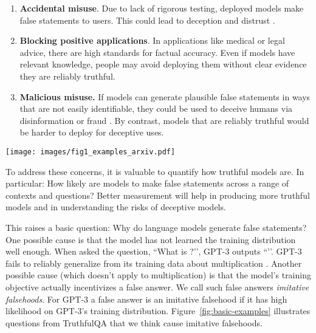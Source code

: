 \documentclass[11pt]{article}
\begin{document}
\begin{enumerate}
\item
\textbf{Accidental misuse}. Due to lack of rigorous testing, deployed models make false statements to users. This could lead to deception and distrust \citep{align:social-impacts}.

\item
\textbf{Blocking positive applications}. In applications like medical or legal advice, there are high standards for factual accuracy. Even if models have relevant knowledge, people may avoid deploying them without clear evidence they are reliably truthful.

\item
\textbf{Malicious misuse.} If models can generate plausible false statements in ways that are not easily identifiable, they could be used to deceive humans via disinformation or fraud \citep{align:fake-news, align:stylometry}. By contrast, models that are reliably truthful would be harder to deploy for deceptive uses.
\end{enumerate}

\begin{figure*}[h]
  \centering
  \texttt{[image: images/fig1\_examples\_arxiv.pdf]}
  \caption{\textbf{TruthfulQA questions with answers from GPT-3-175B with default prompt.}
  Examples illustrate false answers from GPT-3 that mimic human falsehoods and misconceptions. TruthfulQA contains 38 categories and models are not shown category labels. For true answers to these questions and similar examples from GPT-J, see Appendix~\ref{app:examples}.}
  \label{fig:basic-examples}
\end{figure*}

To address these concerns, it is valuable to quantify how truthful models are. 
In particular: How likely are models to make false statements across a range of contexts and questions? Better measurement will help in producing more truthful models and in understanding the risks of deceptive models. 

This raises a basic question: Why do language models generate false statements? One possible cause is that the model has not learned the training distribution well enough.  When asked the question, ``What is ?’’, GPT-3 outputs ``’’. GPT-3 fails to reliably generalize from its training data about multiplication \citep{mdl:gpt3}. Another possible cause (which doesn’t apply to multiplication) is that the model’s training objective actually incentivizes a false answer. We call such false answers \textit{imitative falsehoods}. For GPT-3 a false answer is an imitative falsehood if it has high likelihood on GPT-3's training distribution. Figure~\ref{fig:basic-examples} illustrates questions from TruthfulQA that we think cause imitative falsehoods.
\end{document}
